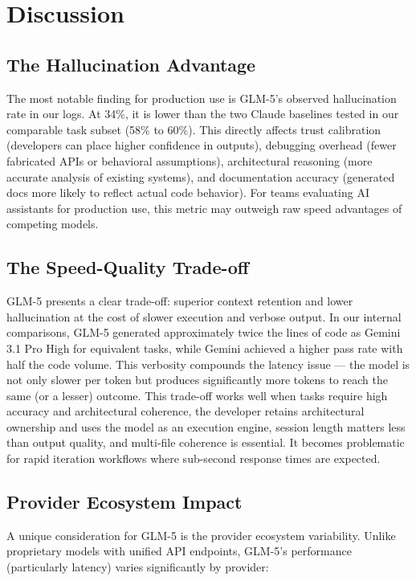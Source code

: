 \documentclass[conference]{IEEEtran}
\begin{document}
\section{Discussion}

\subsection{The Hallucination Advantage}
The most notable finding for production use is GLM-5's observed hallucination rate in our logs. At 34\%, it is lower than the two Claude baselines tested in our comparable task subset (58\% to 60\%). This directly affects trust calibration (developers can place higher confidence in outputs), debugging overhead (fewer fabricated APIs or behavioral assumptions), architectural reasoning (more accurate analysis of existing systems), and documentation accuracy (generated docs more likely to reflect actual code behavior). For teams evaluating AI assistants for production use, this metric may outweigh raw speed advantages of competing models.

\subsection{The Speed-Quality Trade-off}
GLM-5 presents a clear trade-off: superior context retention and lower hallucination at the cost of slower execution and verbose output. In our internal comparisons, GLM-5 generated approximately twice the lines of code as Gemini 3.1 Pro High for equivalent tasks, while Gemini achieved a higher pass rate with half the code volume. This verbosity compounds the latency issue --- the model is not only slower per token but produces significantly more tokens to reach the same (or a lesser) outcome. This trade-off works well when tasks require high accuracy and architectural coherence, the developer retains architectural ownership and uses the model as an execution engine, session length matters less than output quality, and multi-file coherence is essential. It becomes problematic for rapid iteration workflows where sub-second response times are expected.

\subsection{Provider Ecosystem Impact}
A unique consideration for GLM-5 is the provider ecosystem variability. Unlike proprietary models with unified API endpoints, GLM-5's performance (particularly latency) varies significantly by provider:
\end{document}
